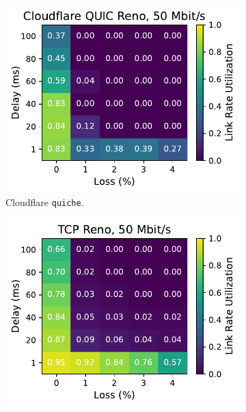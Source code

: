 \begin{figure}[ht]
\begin{subfigure}[b]{0.22\linewidth}
        \includegraphics[width=\linewidth,trim={0 0 2cm 0},clip]{splitting/figures/heatmaps/heatmap_quiche_reno_50mbps.pdf}
        \caption{Cloudflare \texttt{quiche}.}
    \end{subfigure}
    \begin{subfigure}[b]{0.89cm}
        \includegraphics[width=\linewidth,trim={8cm 0 0 0},clip]{splitting/figures/heatmaps/heatmap_tcp_reno_50mbps.pdf}

\end{subfigure}
\end{figure}

